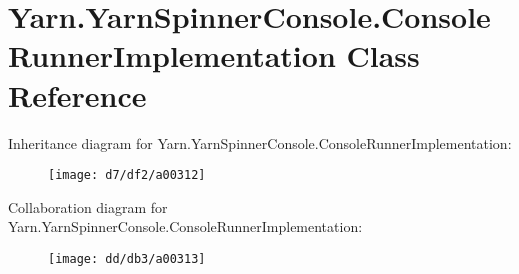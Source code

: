 \hypertarget{a00030}{\section{Yarn.\-Yarn\-Spinner\-Console.\-Console\-Runner\-Implementation Class Reference}
\label{a00030}
}


Inheritance diagram for Yarn.\-Yarn\-Spinner\-Console.\-Console\-Runner\-Implementation\-:
\nopagebreak
\begin{figure}[H]
\begin{center}
\leavevmode
\texttt{[image: d7/df2/a00312]}
\end{center}
\end{figure}


Collaboration diagram for Yarn.\-Yarn\-Spinner\-Console.\-Console\-Runner\-Implementation\-:
\nopagebreak
\begin{figure}[H]
\begin{center}
\leavevmode
\texttt{[image: dd/db3/a00313]}
\end{center}
\end{figure}
